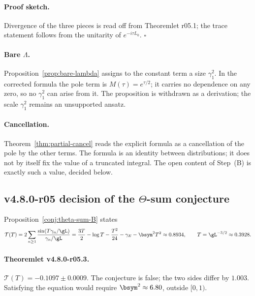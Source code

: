\paragraph{Proof sketch.}
Divergence of the three pieces is read off from Theoremlet r05.1; the trace statement follows
from the unitarity of \(e^{-i\tau L_0}\).  \(\square\)

\paragraph{Bare \(\Lambda\).}
Proposition~\ref{prop:bare-lambda} assigns to the constant term a size \(\gamma_1^2\).  In the corrected
formula the pole term is \(M(\tau)=e^{\tau/2}\); it carries no dependence on any zero, so no
\(\gamma_1^2\) can arise from it.  The proposition is withdrawn as a derivation; the scale
\(\gamma_1^2\) remains an unsupported ansatz.

\paragraph{Cancellation.}
Theorem~\ref{thm:partial-cancel} reads the explicit formula as a cancellation of the pole by the
other terms.  The formula is an identity between distributions; it does not by itself fix the value
of a truncated integral.  The open content of Step~(B) is exactly such a value, decided below.

\subsection*{v4.8.0-r05 decision of the \texorpdfstring{$\Theta$}{Theta}-sum conjecture}
\label{subsec:v480-r05-theta-sum-decision}

Proposition~\ref{conj:theta-sum-B} states
\[
\mathcal T(T)=2\sum_{n\ge1}\frac{\sin(T\gamma_n/\gL)}{\gamma_n/\gL}
=\frac{3T}{2}-\log T-\frac{T^2}{24}-\gamma_E-\bsym^2T^2\approx0.8934,
\qquad T=\gL^{-3/2}\approx0.3928 .
\]

\paragraph{Theoremlet v4.8.0-r05.3.}
\(\mathcal T(T)=-0.1097\pm0.0009\).  The conjecture is false; the two sides differ by \(1.003\).
Satisfying the equation would require \(\bsym^2\approx6.80\), outside \([0,1)\).

